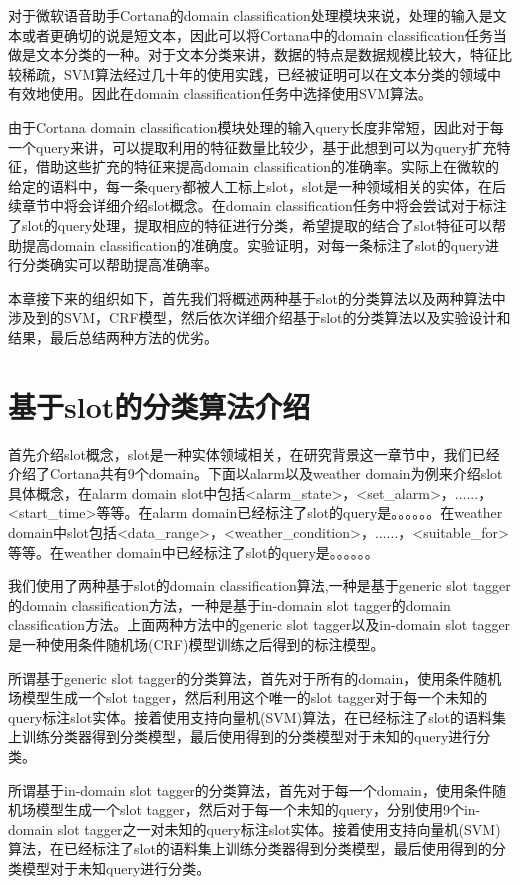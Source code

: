 \documentclass[master]{njuthesis}
\begin{document}
    对于微软语音助手Cortana的domain classification处理模块来说，处理的输入是文本或者更确切的说是短文本，因此可以将Cortana中的domain classification任务当做是文本分类的一种。对于文本分类来讲，数据的特点是数据规模比较大，特征比较稀疏，SVM算法经过几十年的使用实践，已经被证明可以在文本分类的领域中有效地使用。因此在domain classification任务中选择使用SVM算法。
    
    由于Cortana domain classification模块处理的输入query长度非常短，因此对于每一个query来讲，可以提取利用的特征数量比较少，基于此想到可以为query扩充特征，借助这些扩充的特征来提高domain classification的准确率。实际上在微软的给定的语料中，每一条query都被人工标上slot，slot是一种领域相关的实体，在后续章节中将会详细介绍slot概念。在domain classification任务中将会尝试对于标注了slot的query处理，提取相应的特征进行分类，希望提取的结合了slot特征可以帮助提高domain classification的准确度。实验证明，对每一条标注了slot的query进行分类确实可以帮助提高准确率。
    
    本章接下来的组织如下，首先我们将概述两种基于slot的分类算法以及两种算法中涉及到的SVM，CRF模型，然后依次详细介绍基于slot的分类算法以及实验设计和结果，最后总结两种方法的优劣。

    
\section{基于slot的分类算法介绍}
   
    首先介绍slot概念，slot是一种实体领域相关，在研究背景这一章节中，我们已经介绍了Cortana共有9个domain。下面以alarm以及weather domain为例来介绍slot具体概念，在alarm domain slot中包括<alarm\_state>，<set\_alarm>，......，<start\_time>等等。在alarm domain已经标注了slot的query是。。。。。。在weather domain中slot包括<data\_range>，<weather\_condition>，......，<suitable\_for>等等。在weather domain中已经标注了slot的query是。。。。。。

    我们使用了两种基于slot的domain classification算法,一种是基于generic slot tagger的domain classification方法，一种是基于in-domain slot tagger的domain classification方法。上面两种方法中的generic slot tagger以及in-domain slot tagger是一种使用条件随机场(CRF)模型训练之后得到的标注模型。
    
    所谓基于generic slot tagger的分类算法，首先对于所有的domain，使用条件随机场模型生成一个slot tagger，然后利用这个唯一的slot tagger对于每一个未知的query标注slot实体。接着使用支持向量机(SVM)算法，在已经标注了slot的语料集上训练分类器得到分类模型，最后使用得到的分类模型对于未知的query进行分类。

    所谓基于in-domain slot tagger的分类算法，首先对于每一个domain，使用条件随机场模型生成一个slot tagger，然后对于每一个未知的query，分别使用9个in-domain slot tagger之一对未知的query标注slot实体。接着使用支持向量机(SVM)算法，在已经标注了slot的语料集上训练分类器得到分类模型，最后使用得到的分类模型对于未知query进行分类。
    
\end{document}
